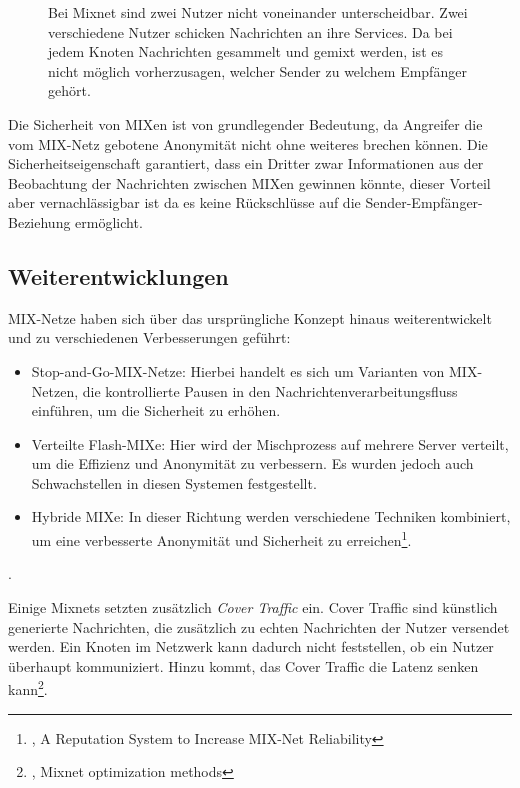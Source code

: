 \begin{figure}[ht!]
    \centering
    
    \caption{Bei Mixnet sind zwei Nutzer nicht voneinander unterscheidbar. Zwei verschiedene Nutzer schicken Nachrichten an ihre Services. Da bei jedem Knoten Nachrichten gesammelt und gemixt werden, ist es nicht möglich vorherzusagen, welcher Sender zu welchem Empfänger gehört.}
    \label{imgs:mixnet_transfer}
\end{figure}

Die Sicherheit von MIXen ist von grundlegender Bedeutung, da Angreifer die vom MIX-Netz gebotene Anonymität nicht ohne weiteres brechen können. Die Sicherheitseigenschaft garantiert, dass ein Dritter zwar Informationen aus der Beobachtung der Nachrichten zwischen MIXen gewinnen könnte, dieser Vorteil aber vernachlässigbar ist da es keine Rückschlüsse auf die Sender-Empfänger-Beziehung ermöglicht.

\subsection{Weiterentwicklungen}
\label{chap:mixnet_enhancements}

MIX-Netze haben sich über das ursprüngliche Konzept hinaus weiterentwickelt und zu verschiedenen Verbesserungen geführt:

\begin{itemize}
    \item Stop-and-Go-MIX-Netze: Hierbei handelt es sich um Varianten von MIX-Netzen, die kontrollierte Pausen in den Nachrichtenverarbeitungsfluss einführen, um die Sicherheit zu erhöhen.
    \item Verteilte \glqq Flash-MIXe\grqq: Hier wird der Mischprozess auf mehrere Server verteilt, um die Effizienz und Anonymität zu verbessern. Es wurden jedoch auch Schwachstellen in diesen Systemen festgestellt.
    \item Hybride MIXe: In dieser Richtung werden verschiedene Techniken kombiniert, um eine verbesserte Anonymität und Sicherheit zu erreichen\footnote{\cite{MIXNetReliability}, A Reputation System to Increase MIX-Net Reliability}.
\end{itemize}.

Einige Mixnets setzten zusätzlich \textit{Cover Traffic} ein. Cover Traffic sind künstlich generierte Nachrichten, die zusätzlich zu echten Nachrichten der Nutzer versendet werden. Ein Knoten im Netzwerk kann dadurch nicht feststellen, ob ein Nutzer überhaupt kommuniziert. Hinzu kommt, das Cover Traffic die Latenz senken kann\footnote{\cite{MixnetOptimizationMethods}, Mixnet optimization methods}.

